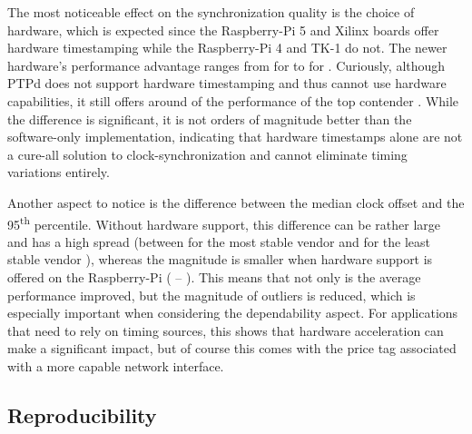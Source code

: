 
The most noticeable effect on the synchronization quality is the choice of hardware, which is expected since the Raspberry-Pi 5 and Xilinx boards offer hardware timestamping while the Raspberry-Pi 4 and TK-1 do not. The newer hardware's performance advantage ranges from \fRatio{\cmpMin} for \fVendor{\cmpMinArg} to \fRatio{\cmpMax} for \fVendor{\cmpMaxArg}. Curiously, although PTPd does not support hardware timestamping and thus cannot use hardware capabilities, it still offers around  of the performance of the top contender . While the difference is significant, it is not orders of magnitude better than the software-only implementation, indicating that hardware timestamps alone are not a cure-all solution to clock-synchronization and cannot eliminate timing variations entirely.


%
Another aspect to notice is the difference between the median clock offset and the 95\textsuperscript{th} percentile. Without hardware support, this difference can be rather large and has a high spread (between \fRatio{\cmpMin} for the most stable vendor \fVendor{\cmpMinArg} and \fRatio{\cmpMax} for the least stable vendor \fVendor{\cmpMaxArg}),
whereas the magnitude is smaller when hardware support is offered on the Raspberry-Pi %
%
(\fRatio[1]{\cmpMin} \fVendor{\cmpMinArg} -- \fRatio[1]{\cmpMax} \fVendor{\cmpMaxArg}).
This means that not only is the average performance improved, but the magnitude of outliers is reduced, which is especially important when considering the dependability aspect. For applications that need to rely on timing sources, this shows that hardware acceleration can make a significant impact, but of course this comes with the price tag associated with a more capable network interface.

\subsection{Reproducibility}

